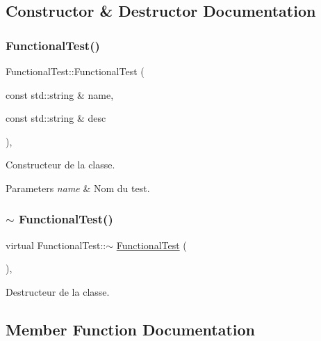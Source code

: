 \subsection{Constructor \& Destructor Documentation}
\mbox{\label{classFunctionalTest_a2a6a15ddfbeb221b6eedc486138504c3}} 
\subsubsection{\texorpdfstring{Functional\+Test()}{FunctionalTest()}}
{\footnotesize\ttfamily Functional\+Test\+::\+Functional\+Test (\begin{DoxyParamCaption}\item[{const std\+::string \&}]{name,  }\item[{const std\+::string \&}]{desc }\end{DoxyParamCaption})\hspace{0.3cm}{\ttfamily [inline]}, {\ttfamily [protected]}}



Constructeur de la classe. 


\begin{DoxyParams}{Parameters}
{\em name} & Nom du test. \\
\hline
\end{DoxyParams}
\mbox{\label{classFunctionalTest_ab3207865c4ba2087ae1611ca92da07d7}} 
\subsubsection{\texorpdfstring{$\sim$ Functional\+Test()}{~ FunctionalTest()}}
{\footnotesize\ttfamily virtual Functional\+Test\+::$\sim$ \hyperlink{classFunctionalTest}{Functional\+Test} (\begin{DoxyParamCaption}{ }\end{DoxyParamCaption})\hspace{0.3cm}{\ttfamily [inline]}, {\ttfamily [virtual]}}

Destructeur de la classe. 

\subsection{Member Function Documentation}
\mbox{\label{classFunctionalTest_a7b310fa513c607660bf445cc36959eac}} 
